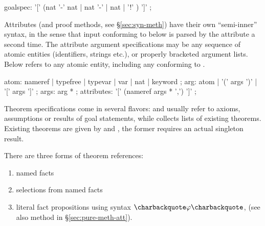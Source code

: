 \begin{isabellebody}
\begin{isamarkuptext}
  \begin{rail}
    goalspec: '[' (nat '-' nat | nat '-' | nat | '!' ) ']'
    ;
  \end{rail}%
\end{isamarkuptext}%
\isamarkuptrue%
%
\isamarkuptrue%
%
\begin{isamarkuptext}%
Attributes (and proof methods, see \S\ref{sec:syn-meth}) have their
  own ``semi-inner'' syntax, in the sense that input conforming to
   below is parsed by the attribute a second time.
  The attribute argument specifications may be any sequence of atomic
  entities (identifiers, strings etc.), or properly bracketed argument
  lists.  Below  refers to any atomic entity, including
  any  conforming to .

  \begin{rail}
    atom: nameref | typefree | typevar | var | nat | keyword
    ;
    arg: atom | '(' args ')' | '[' args ']'
    ;
    args: arg *
    ;
    attributes: '[' (nameref args * ',') ']'
    ;
  \end{rail}

  Theorem specifications come in several flavors:
   and  usually refer to
  axioms, assumptions or results of goal statements, while
   collects lists of existing theorems.  Existing
  theorems are given by  and
  , the former requires an actual singleton
  result.

  There are three forms of theorem references:
  \begin{enumerate}
  
  \item named facts 

  \item selections from named facts 

  \item literal fact propositions using  syntax
  $\backquote\phi\backquote$, (see also method  in
  \S\ref{sec:pure-meth-att}).

  \end{enumerate}


\end{isamarkuptext}
\end{isabellebody}
